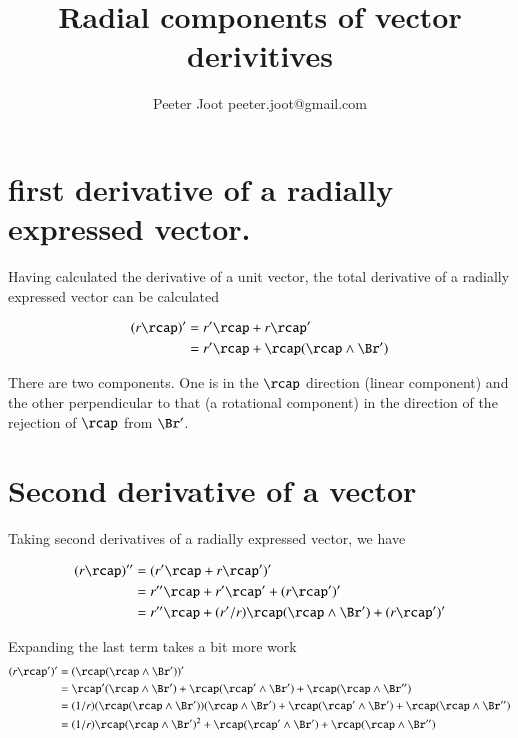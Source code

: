 \documentclass{article}      %
\title{Radial components of vector derivitives} %
\author{Peeter Joot \quad peeter.joot@gmail.com}         %
\newcommand{\BrPrimeRej}[0]{\rcap(\rcap \wedge \Br')}
\begin{document}

\maketitle{}

\section{first derivative of a radially expressed vector.}

Having calculated the derivative of a unit vector, the total 
derivative of a radially expressed vector can be calculated

\begin{align*}
(r\rcap)'  
   &= r'\rcap  + r\rcap' \\
   &= r'\rcap  + \BrPrimeRej \\
\end{align*}

There are two components.  One is in the $\rcap$ direction (linear component)
and the other perpendicular to that (a rotational component) in the direction of the rejection
of $\rcap$ from $\Br'$.

\section{Second derivative of a vector}

Taking second derivatives of a radially expressed vector, we have

\begin{align*}
(r\rcap)'' 
   &= (r'\rcap + r{\rcap}')' \\
   &= r''\rcap + r'\rcap' + (r\rcap')' \\
   &= r''\rcap + (r'/r)\BrPrimeRej + (r\rcap')' \\
\end{align*}

Expanding the last term takes a bit more work
\begin{align*}
(r\rcap')' 
   &= (\BrPrimeRej)' \\
   &= 
\rcap'(\rcap \wedge \Br') +
\rcap(\rcap' \wedge \Br') +
\rcap(\rcap \wedge \Br'') \\
   &= 
(1/r)(\BrPrimeRej)(\rcap \wedge \Br') +
\rcap(\rcap' \wedge \Br') +
\rcap(\rcap \wedge \Br'') \\
   &= 
(1/r)\rcap(\rcap \wedge \Br')^2 +
\rcap(\rcap' \wedge \Br') +
\rcap(\rcap \wedge \Br'') \\
\end{align*}
\end{document}
